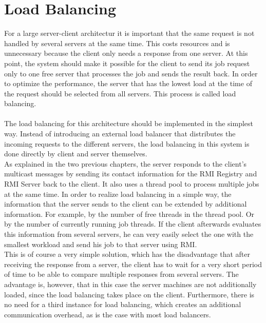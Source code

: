 \section{Load Balancing}
For a large server-client architectur it is important that the same request is not handled by several servers at the same time. This costs resources and is unnecessary because the client only needs a response from one server. At this point, the system should make it possible for the client to send its job request only to one free server that processes the job and sends the result back. In order to optimize the performance, the server that has the lowest load at the time of the request should be selected from all servers. This process is called load balancing.
\\
\\
The load balancing for this architecture should be implemented in the simplest way. Instead of introducing an external load balancer that distributes the incoming requests to the different servers, the load balancing in this system is done directly by client and server themselves.
\\
As explained in the two previous chapters, the server responds to the client's multicast messages by sending its contact information for the RMI Registry and RMI Server back to the client. It also uses a thread pool to process multiple jobs at the same time. In order to realize load balancing in a simple way, the information that the server sends to the client can be extended by additional information. For example, by the number of free threads in the thread pool. Or by the number of currently running job threads. If the client afterwards evaluates this information from several servers, he can very easily select the one with the smallest workload and send his job to that server using RMI. 
\\
This is of course a very simple solution, which has the disadvantage that after receiving the response from a server, the client has to wait for a very short period of time to be able to compare multiple responses from several servers. The advantage is, however, that in this case the server machines are not additionally loaded, since the load balancing takes place on the client. Furthermore, there is no need for a third instance for load balancing, which creates an additional communication overhead, as is the case with most load balancers.
